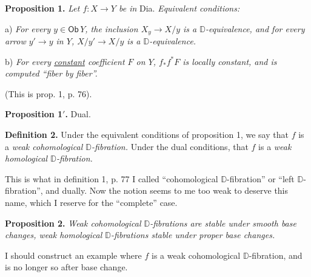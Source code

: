 \documentclass[11pt]{article}
\newcommand{\msp}[1]{\marginpar{\footnotesize [#1]}}
\newcommand{\Dia}{\textsf{Dia}}
\newcommand{\DD}{\mathbb{D}}
\begin{document}
\textbf{Proposition 1.} \textit{Let $f : X \to Y$ be in} \Dia. \textit{Equivalent conditions:}

a) \textit{For every $y \in \mathsf{Ob}\, Y$, the inclusion $X_y \to X/y$ is a $\DD$-equivalence, and for every arrow $y' \to y$ in $Y$, $X/y' \to X/y$ is a $\DD$-equivalence.}

b) \textit{For every \underline{constant} coefficient $F$ on $Y$, $f_{*}f^{*}F$ is locally constant, and is computed ``fiber by fiber''.}

(This is prop. 1, p. 76).

\textbf{Proposition 1$'$.} Dual.

\msp{page 116}

\textbf{Definition 2.} Under the equivalent conditions of proposition 1, we say that $f$ is a \textit{weak cohomological $\DD$-fibration.} Under the dual conditions, that $f$ is a \textit{weak homological $\DD$-fibration.}

This is what in definition 1, p. 77 I called ``cohomological $\DD$-fibration'' or ``left $\DD$-fibration'', and dually. Now the notion seems to me too weak to deserve this name, which I reserve for the ``complete'' case.

\textbf{Proposition 2.} \textit{Weak cohomological $\DD$-fibrations are stable under smooth base changes, weak homological $\DD$-fibrations stable under proper base changes.}

I should construct an example where $f$ is a weak cohomological $\DD$-fibration, and is no longer so after base change.
\end{document}
